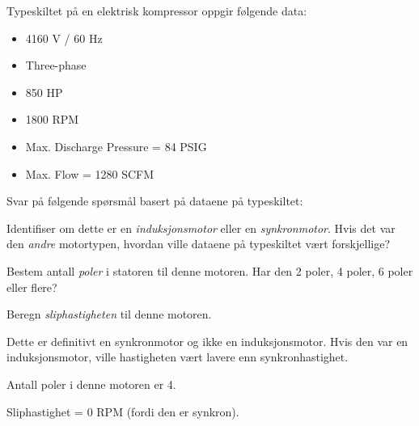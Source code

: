 

Typeskiltet på en elektrisk kompressor oppgir følgende data:

\begin{itemize}
\item{} 4160 V / 60 Hz
\item{} Three-phase
\item{} 850 HP
\item{} 1800 RPM
\item{} Max. Discharge Pressure = 84 PSIG
\item{} Max. Flow = 1280 SCFM
\end{itemize}

\vskip 10pt

\noindent
Svar på følgende spørsmål basert på dataene på typeskiltet:

\vskip 10pt

Identifiser om dette er en {\it induksjonsmotor} eller en {\it synkronmotor}. Hvis det var den {\it andre} motortypen, hvordan ville dataene på typeskiltet vært forskjellige?

\vskip 10pt

Bestem antall {\it poler} i statoren til denne motoren. Har den 2 poler, 4 poler, 6 poler eller flere?

\vskip 10pt

Beregn {\it sliphastigheten} til denne motoren.

\vskip 10pt







Dette er definitivt en synkronmotor og ikke en induksjonsmotor. Hvis den var en induksjonsmotor, ville hastigheten vært lavere enn synkronhastighet.
 
\vskip 10pt

Antall poler i denne motoren er 4.

\vskip 10pt

Sliphastighet = 0 RPM (fordi den er synkron).







